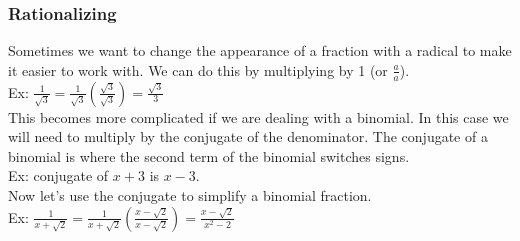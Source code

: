 \subsubsection{Rationalizing}
Sometimes we want to change the appearance of a fraction with a radical to make it easier to work with. We can do this by multiplying by 1 (or $\frac{a}{a}$).\\
Ex: $\frac{1}{\sqrt{3}}=\frac{1}{\sqrt{3}}\left(\frac{\sqrt{3}}{\sqrt{3}}\right)=\frac{\sqrt{3}}{3}$\\
This becomes more complicated if we are dealing with a binomial. In this case we will need to multiply by the conjugate of the denominator. The conjugate of a binomial is where the second term of the binomial switches signs.\\
Ex: conjugate of $x+3$ is $x-3$.\\
Now let's use the conjugate to simplify a binomial fraction.\\
Ex: $\frac{1}{x+\sqrt{2}}=\frac{1}{x+\sqrt{2}}\left(\frac{x-\sqrt{2}}{x-\sqrt{2}}\right)=\frac{x-\sqrt{2}}{x^2-2}$
